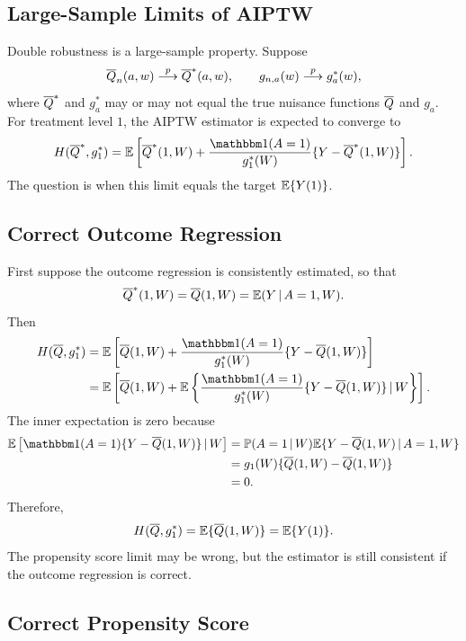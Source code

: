 \label{lec:7-3}

\subsection{Large-Sample Limits of AIPTW}

Double robustness is a large-sample property. Suppose
\[
\overline{Q}_n(a,w)\overset{p}{\longrightarrow}\overline{Q}^*(a,w),
\qquad
g_{n,a}(w)\overset{p}{\longrightarrow}g_a^*(w),
\]
where $\overline{Q}^*$ and $g_a^*$ may or may not equal the true nuisance functions
$\overline{Q}$ and $g_a$. For treatment level $1$, the AIPTW estimator is expected to
converge to
\[
H(\Qbar^*,g_1^*)
=
\E\left[
\Qbar^*(1,W)
+
\frac{\ind(A=1)}{g_1^*(W)}
\{Y-\Qbar^*(1,W)\}
\right].
\]
The question is when this limit equals the target $\mathbb{E}\{Y(1)\}$.

\subsection{Correct Outcome Regression}

First suppose the outcome regression is consistently estimated, so that
\[
\overline{Q}^*(1,W)=\overline{Q}(1,W)=\mathbb{E}(Y\,\vert\, A=1,W).
\]
Then
\[
\begin{aligned}
H(\Qbar,g_1^*)
&=
\E\left[
\Qbar(1,W)
+
\frac{\ind(A=1)}{g_1^*(W)}
\{Y-\Qbar(1,W)\}
\right]\\
&=
\E\left[
\Qbar(1,W)
+
\E\left\{
\frac{\ind(A=1)}{g_1^*(W)}
\{Y-\Qbar(1,W)\}
\given W
\right\}
\right].
\end{aligned}
\]
The inner expectation is zero because
\[
\begin{aligned}
\E\left[
\ind(A=1)\{Y-\Qbar(1,W)\}
\given W
\right]
&=
\Prob(A=1\given W)
\E\{Y-\Qbar(1,W)\given A=1,W\}\\
&=
g_1(W)\{ \Qbar(1,W)-\Qbar(1,W)\}\\
&=0.
\end{aligned}
\]
Therefore,
\[
H(\overline{Q},g_1^*)=\mathbb{E}\{\overline{Q}(1,W)\}=\mathbb{E}\{Y(1)\}.
\]
The propensity score limit may be wrong, but the estimator is still consistent if the
outcome regression is correct.

\subsection{Correct Propensity Score}

